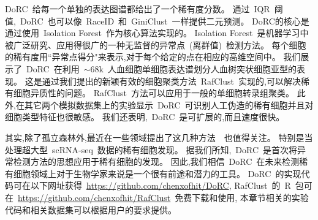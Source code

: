 DoRC~给每一个单独的表达图谱都给出了一个稀有度分数。
通过~IQR~阈值,~DoRC~也可以像~RaceID~和~GiniClust~一样提供二元预测。
DoRC的核心是通过使用~Isolation Forest~作为核心算法实现的。
Isolation Forest~是机器学习中被广泛研究、应用得很广的一种无监督的异常点~(离群值)~检测方法。
每个细胞的稀有度用``异常点得分"来表示,对于每个给定的点在相应的高维空间中。
我们展示了~DoRC~在利用~${\sim}68$k~人血细胞单细胞表达谱划分人血树突状细胞亚型的表现。
这是通过我们提出的新颖有效的细胞聚类方法~RafClust~实现的,可以解决稀有细胞异质性的问题。
RafClust~方法可以应用于一般的单细胞转录组聚类。
此外,在其它两个模拟数据集上的实验显示~DoRC~可识别人工伪造的稀有细胞并且对细胞类型特征也很敏感。
我们还表明,~DoRC~是可扩展的,而且速度很快。

其实,除了孤立森林外,最近在一些领域提出了这几种方法~\cite{aggarwal2015theoretical,zhao2019pyod,liu2019generative,weng2019multi}~也值得关注。
特别是当处理超大型~scRNA-seq~数据的稀有细胞发现。
据我们所知,~DoRC~是首次将异常检测方法的思想应用于稀有细胞的发现。
因此,我们相信~DoRC~在未来检测稀有细胞领域上对于生物学家来说是一个很有前途和潜力的工具。
DoRC~的实现代码可在以下网址获得~\url{https://github.com/chenxofhit/DoRC},
RafClust~的~R~包可在~\url{https://github.com/chenxofhit/RafClust}~免费下载和使用,
本章节相关的实验代码和相关数据集可以根据用户的要求提供。

